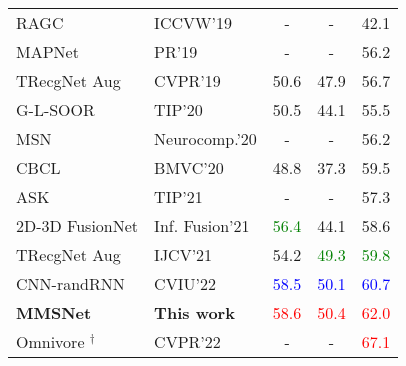 \begin{table}[!t]
\begin{center}
\begin{adjustbox}{width=\columnwidth}
\begin{tabular}{ llccc }
				RAGC \citep{2019_ICCVW_Montoro} 					& ICCVW'19			& - 	           	& - 	        	& 42.1 		\\ 
				MAPNet \citep{2019_PR_Li} 							& PR'19				& - 	           	& - 	        	& 56.2 		\\ 
				TRecgNet Aug \citep{2019_CVPR_Du}         			& CVPR'19			& 50.6 				& 47.9 				& 56.7 		\\
				G-L-SOOR \citep{2020_TIP_Song}         				& TIP'20			& 50.5 	           	& 44.1 	        	& 55.5		\\
				MSN \citep{2020_Neuroc_Xiong}         				& Neurocomp.'20		& - 	           	& - 	        	& 56.2		\\
				CBCL \citep{2020_BMVC_Ayub}         				& BMVC'20			& 48.8 				& 37.3 	        	& 59.5 		\\ 
				ASK \citep{2021_TIP_Xiong}  						& TIP'21			& - 				& -	        		& 57.3 		\\
				2D-3D FusionNet \citep{2021_IF_Montoro}  			& Inf. Fusion'21	& \bftab\textcolor{green}{56.4} 				& 44.1	        	& 58.6 		\\
				TRecgNet Aug \citep{2021_IJCV_Du}  					& IJCV'21			& 54.2 				& \bftab\textcolor{green}{49.3} 	        	& \bftab\textcolor{green}{59.8} 		\\
				CNN-randRNN \citep{2022_CVIU_Caglayan}   			& CVIU'22			& \bftab\textcolor{blue}{58.5} 				& \bftab\textcolor{blue}{50.1} 				& \bftab\textcolor{blue}{60.7} 		\\ 
				\textbf{MMSNet}  									& \textbf{This work	}		& \bftab\textcolor{red}{58.6}		& \bftab\textcolor{red}{50.4}  	& \bftab\textcolor{red}{62.0} 	\\ \hline
				Omnivore \citep{2022_CVPR_Girdhar} $^\dagger$		& CVPR'22			& - 				&- 				& \bftab\textcolor{red}{67.1} 		\\
				\hline
			\end{tabular}
		\end{adjustbox}
		\label{table:sunrgbdResults}
	\end{center}
\end{table}
